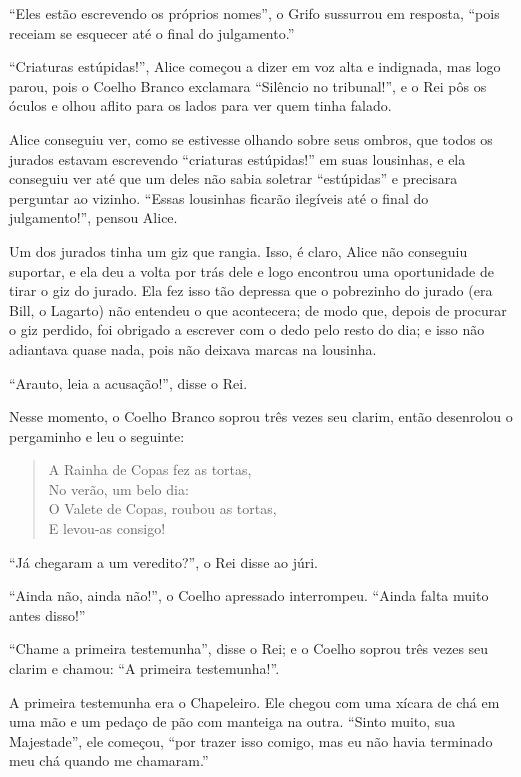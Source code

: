 ``Eles estão escrevendo os próprios nomes'', o Grifo sussurrou em
resposta, ``pois receiam se esquecer até o final do julgamento.''

``Criaturas estúpidas!'', Alice começou a dizer em voz alta e indignada,
mas logo parou, pois o Coelho Branco exclamara ``Silêncio no
tribunal!'', e o Rei pôs os óculos e olhou aflito para os lados para
ver quem tinha falado.

Alice conseguiu ver, como se estivesse olhando sobre seus ombros, que
todos os jurados estavam escrevendo ``criaturas estúpidas!'' em suas
lousinhas, e ela conseguiu ver até que um deles não sabia soletrar
``estúpidas'' e precisara perguntar ao vizinho. ``Essas lousinhas
ficarão ilegíveis até o final do julgamento!'', pensou Alice.

Um dos jurados tinha um giz que rangia. Isso, é claro, Alice não
conseguiu suportar, e ela deu a volta por trás dele e logo encontrou
uma oportunidade de tirar o giz do jurado. Ela fez isso tão depressa que
o pobrezinho do jurado (era Bill, o Lagarto) não entendeu o que
acontecera; de modo que, depois de procurar o giz perdido, foi obrigado a
escrever com o dedo pelo resto do dia; e isso não adiantava quase nada,
pois não deixava marcas na lousinha.

``Arauto, leia a acusação!'', disse o Rei.

Nesse momento, o Coelho Branco soprou três vezes seu clarim, então
desenrolou o pergaminho e leu o seguinte:

\begin{quote}
A Rainha de Copas fez as tortas,\\
No verão, um belo dia:\\
O Valete de Copas, roubou as tortas,\\
E levou-as consigo!
\end{quote}

``Já chegaram a um veredito?'', o Rei disse ao júri.

``Ainda não, ainda não!'', o Coelho apressado interrompeu. ``Ainda falta
muito antes disso!''

``Chame a primeira testemunha'', disse o Rei; e o Coelho soprou três
vezes seu clarim e chamou: ``A primeira testemunha!''.

A primeira testemunha era o Chapeleiro. Ele chegou com uma xícara de chá
em uma mão e um pedaço de pão com manteiga na outra. ``Sinto muito, sua
Majestade'', ele começou, ``por trazer isso comigo, mas eu não havia
terminado meu chá quando me chamaram.''

